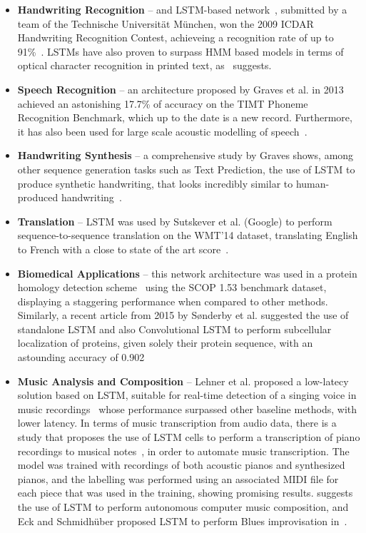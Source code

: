 \begin{itemize}
    \item \textbf{Handwriting Recognition} -- and LSTM-based network~\cite{Bertolami09}, submitted by a team of the Technische Universität München, won the 2009 ICDAR Handwriting Recognition Contest, achieveing a recognition rate of up to 91\%~\cite{ICDAR09}. LSTMs have also proven to surpass HMM based models in terms of optical character recognition in printed text, as~\cite{Breuel13} suggests.

    \item \textbf{Speech Recognition} -- an architecture\cite{Graves13} proposed by Graves et al. in 2013 achieved an astonishing 17.7\% of accuracy on the TIMT Phoneme Recognition Benchmark, which up to the date is a new record. Furthermore, it has also been used for large scale acoustic modelling of speech~\cite{Sak14}.

    \item \textbf{Handwriting Synthesis} -- a comprehensive study by Graves shows, among other sequence generation tasks such as Text Prediction, the use of LSTM to produce synthetic handwriting, that looks incredibly similar to human-produced handwriting~\cite{Graves13_2}.

    \item \textbf{Translation} -- LSTM was used by Sutskever et al. (Google) to perform sequence-to-sequence translation on the WMT'14 dataset, translating English to French with a close to state of the art score~\cite{Sustkever14}.

    \item \textbf{Biomedical Applications} -- this network architecture was used in a protein homology detection scheme~\cite{Hochreiter07} using the SCOP 1.53 benchmark dataset, displaying a staggering performance when compared to other methods. Similarly, a recent article from 2015 by Sønderby et al. suggested the use of standalone LSTM and also Convolutional LSTM to perform subcellular localization of proteins, given solely their protein sequence, with an astounding accuracy of 0.902~\cite{Sonderby15}

    \item \textbf{Music Analysis and Composition} -- Lehner et al. proposed a low-latecy solution based on LSTM, suitable for real-time detection of a singing voice in music recordings~\cite{Lehner15} whose performance surpassed other baseline methods, with lower latency. 
        In terms of music transcription from audio data, there is a study that proposes the use of LSTM cells to perform a transcription of piano recordings to musical notes~\cite{Bock12}, in order to automate music transcription. The model was trained with recordings of both acoustic pianos and synthesized pianos, and the labelling was performed using an associated MIDI file for each piece that was used in the training, showing promising results. \cite{Coca13} suggests the use of LSTM to perform autonomous computer music composition, and Eck and Schmidhüber proposed LSTM to perform Blues improvisation in~\cite{Eck02}.


\end{itemize}
